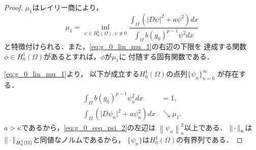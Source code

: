 \begin{proof}
 $\mu_1$はレイリー商により，
 \begin{equation}
  \mu_1 = \inf_{\psi \in H_0^1(\Omega), \psi \not\equiv 0}
   \frac{\displaystyle \int_\Omega 
   \left( \lvert D \psi \rvert^2 + a
    \psi ^2
   \right) dx}{\displaystyle \int_\Omega b (g_0)^{p-1} \psi^2 dx}
   \label{eq:g_0_lin_mu_1}
 \end{equation}
 と特徴付けられる．また，\eqref{eq:g_0_lin_mu_1}の右辺の下限を
 達成する関数$\phi \in H_0^1(\Omega)$があるとすれば，$\phi$が$\mu_1$に
 付随する固有関数である．

 \eqref{eq:g_0_lin_mu_1}より，
 以下が成立する$H_0^1(\Omega)$の点列$\{ \psi_n \}_{n=0}^\infty$
 が存在する．
 \begin{align}
  \int_\Omega b(g_0)^{p-1} \psi_n^2 dx &= 1, \label{eq:g_0_seq_psi_1} \\
  \int_\Omega \left( \lvert D\psi_n \rvert^2 
  + a \psi_n^2 \right) dx
  & \searrow \mu_1. \label{eq:g_0_seq_psi_2}
 \end{align}
 $a > \kappa$であるから，\eqref{eq:g_0_seq_psi_2}の左辺は
 $\left\| \psi_n \right\|_\kappa^2$以上である．
 $\left\|\, \cdot \, \right\|_\kappa$は
 $\left\|\, \cdot \, \right\|_{H_0^1(\Omega)}$と同値なノルムであるから，
 $\{ \psi_n \}$は$H_0^1(\Omega)$の有界列である．
 

\end{proof}
